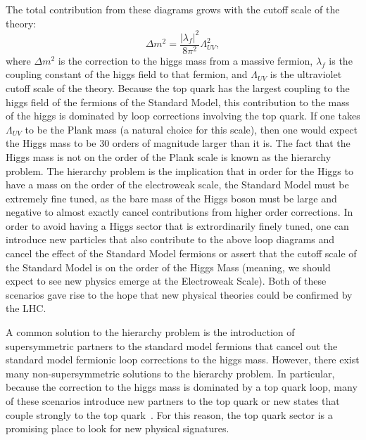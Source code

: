 The total contribution from these diagrams grows with the cutoff scale of the theory:
\begin{equation}
  \Delta m^{2} = \frac{|\lambda_f|^2}{8\pi^2}\Lambda_{UV}^2 ,
\end{equation}
where $\Delta m^{2}$ is the correction to the higgs mass from a massive fermion, $\lambda_f$ is the coupling constant of the higgs field to that fermion,
and $\Lambda_{UV}$ is the ultraviolet cutoff scale of the theory.
Because the top quark has the largest coupling to the higgs field of the fermions of the Standard Model,
this contribution to the mass of the higgs is dominated by loop corrections involving the top quark.
If one takes $\Lambda_{UV}$ to be the Plank mass (a natural choice for this scale),
then one would expect the Higgs mass to be 30 orders of magnitude larger than it is.
The fact that the Higgs mass is not on the order of the Plank scale is known as the hierarchy problem.
The hierarchy problem is the implication that in order for the Higgs to have a mass on the order of the electroweak scale,
the Standard Model must be extremely fine tuned, as the bare mass of the Higgs boson must be large and negative to
almost exactly cancel contributions from higher order corrections.
In order to avoid having a Higgs sector that is extrordinarily finely tuned,
one can introduce new particles that also contribute to the above loop diagrams
and cancel the effect of the Standard Model fermions
or assert that the cutoff scale of the Standard Model is on the order of the Higgs Mass
(meaning, we should expect to see new physics emerge at the Electroweak Scale).
Both of these scenarios gave rise to the hope that new physical theories could be confirmed by the LHC.

A common solution to the hierarchy problem is the introduction of supersymmetric partners to the standard model fermions
that cancel out the standard model fermionic loop corrections to the higgs mass.
However, there exist many non-supersymmetric solutions to the hierarchy problem.
In particular, because the correction to the higgs mass is dominated by a top quark loop,
many of these scenarios introduce new partners to the top quark or new states that couple
strongly to the top quark~\cite{Contino:2008cx,PhysRevD.78.074026,1126-6708-2008-04-087,1126-6708-2009-05-022}.
For this reason, the top quark sector is a promising place to look for new physical signatures.



